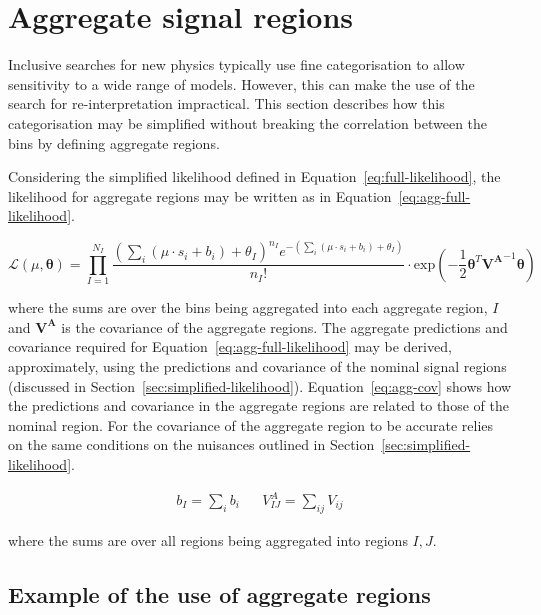 \section{Aggregate signal regions}
\label{sec:aggregate-signal-regions}

Inclusive searches for new physics typically use fine categorisation to allow
sensitivity to a wide range of models. However, this can make the use
of the search for re-interpretation impractical. 
This section describes how this categorisation may be simplified without breaking the correlation 
between the bins by defining aggregate regions.

Considering the simplified likelihood defined in Equation~\ref{eq:full-likelihood},
the likelihood for aggregate regions may be written as in Equation~\ref{eq:agg-full-likelihood}.

\begin{equation}
\mathcal{L}(\mu, \boldsymbol{\theta}) =  \prod_{I=1}^{N_I} \dfrac{(\sum_{i}(\mu \cdot s_{i}+b_{i})+\theta_{I})^{n_{I}} e^{-(\sum_{i}(\mu \cdot s_{i}+b_{i})+\theta_{I})} }{n_{I}!} \cdot
\mathrm{exp}\left(-\dfrac{1}{2} \boldsymbol{\theta}^{T}\mathrm{\mathbf{V^A}}^{-1}\boldsymbol{\theta} \right)
\label{eq:agg-full-likelihood}
\end{equation}

where the sums are over the bins being aggregated into each aggregate region, $I$ and 
$\mathbf{V^A}$ is the covariance of the aggregate regions. The 
aggregate predictions and covariance required for Equation~\ref{eq:agg-full-likelihood}
may be derived, approximately, using the predictions and covariance
of the nominal signal regions (discussed in Section~\ref{sec:simplified-likelihood}).
Equation~\ref{eq:agg-cov} shows how the predictions and covariance in the aggregate
regions are related to those of the nominal region. 
For the covariance of the aggregate region to be accurate relies on the same conditions 
on the nuisances outlined in Section~\ref{sec:simplified-likelihood}. 

\begin{align}
b_{I} = \sum_i b_{i} && V^{A}_{IJ}=\sum_{ij}V_{ij}
\label{eq:agg-cov}
\end{align}

where the sums are over all regions being aggregated into regions $I,J$. 

\subsection{Example of the use of aggregate regions}
\label{sec:agg-toy}

